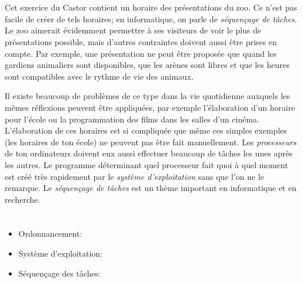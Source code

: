 {{%
\section*{\BrochureItsInformatics}
Cet exercice du Castor contient un horaire des présentations du zoo. Ce n’est pas facile de créer de tels horaires; en informatique, on parle de \emph{séquençage de tâches}. Le zoo aimerait évidemment permettre à ses visiteurs de voir le plus de présentations possible, mais d’autres contraintes doivent aussi être prises en compte. Par exemple, une présentation ne peut être proposée que quand les gardiens animaliers sont disponibles, que les arènes sont libres et que les heures sont compatibles avec le rythme de vie des animaux.

Il existe beaucoup de problèmes de ce type dans la vie quotidienne auxquels les mêmes réflexions peuvent être appliquées, par exemple l’élaboration d’un horaire pour l’école ou la programmation des films dans les salles d’un cinéma. L’élaboration de ces horaires est si compliquée que même ces simples exemples (les horaires de ton école) ne peuvent pas être fait manuellement. Les \emph{processeurs} de ton ordinateurs doivent eux aussi effectuer beaucoup de tâches les unes après les autres. Le programme déterminant quel processeur fait quoi à quel moment est créé très rapidement par le \emph{système d’exploitation} sans que l’on ne le remarque. Le \emph{séquençage de tâches} est un thème important en informatique et en recherche.



\section*{\BrochureWebsitesAndKeywords}
{\raggedright
\begin{itemize}
  \item Ordonnancement: \href{https://fr.wikipedia.org/wiki/Ordonnancement_de_travaux_informatiques}{}
  \item Système d’exploitation: \href{https://fr.wikipedia.org/wiki/Syst\%C3\%A8me_d\%27exploitation}{}
  \item Séquençage des tâches: \href{https://fr.wikipedia.org/wiki/S\%C3\%A9quen\%C3\%A7age_de_t\%C3\%A2ches}{}
\end{itemize}


}}}

